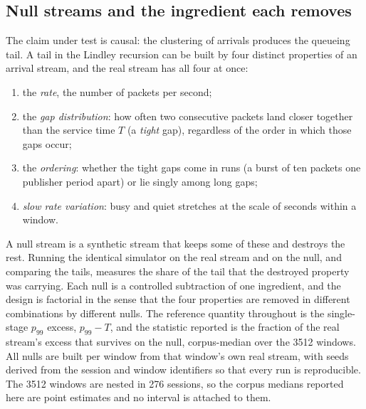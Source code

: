 \documentclass[11pt]{article}
\begin{document}
\subsection{Null streams and the ingredient each removes}
\label{sec:setup-nulls}

The claim under test is causal: the clustering of arrivals produces the queueing tail.
A tail in the Lindley recursion can be built by four distinct properties of an arrival
stream, and the real stream has all four at once:
\begin{enumerate}
    \item the \emph{rate}, the number of packets per second;
    \item the \emph{gap distribution}: how often two consecutive packets land closer together than the service time $T$
(a \emph{tight} gap), regardless of the order in which those gaps occur;
    \item the \emph{ordering}: whether the tight gaps come in runs (a burst of ten packets one publisher period apart)
or lie singly among long gaps;
    \item \emph{slow rate variation}: busy and quiet stretches at the scale of seconds
within a window.
\end{enumerate}
A null stream is a synthetic stream that keeps some of these and destroys the rest.
Running the identical simulator on the real stream and on the null, and comparing the
tails, measures the share of the tail that the destroyed property was carrying. Each
null is a controlled subtraction of one ingredient, and the design is factorial in the
sense that the four properties are removed in different combinations by different nulls.
The reference quantity throughout is the single-stage $p_{99}$ excess, $p_{99} - T$, and
the statistic reported is the fraction of the real stream's excess that survives on the
null, corpus-median over the 3512 windows. All nulls are built per window from that
window's own real stream, with seeds derived from the session and window identifiers so
that every run is reproducible. The 3512 windows are nested in 276 sessions, so the
corpus medians reported here are point estimates and no interval is attached to them.
\end{document}
